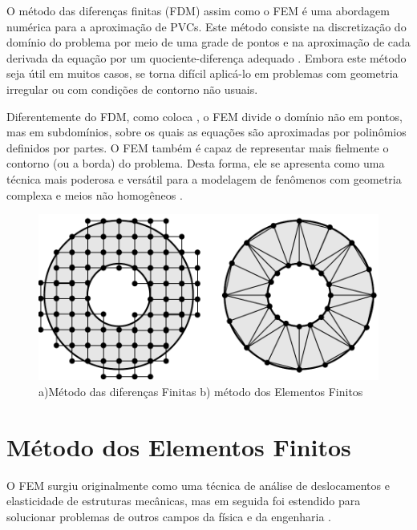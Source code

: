 \documentclass[
    12pt,               %
    openright,          %
    oneside,
    a4paper,            %
    english,            %
    french,             %
    spanish,            %
    brazil              %
    ]{abntex2}
\begin{document}
O método das diferenças finitas (FDM) assim como o FEM é uma abordagem numérica para a aproximação de PVCs. Este método consiste na discretização do domínio do problema por meio de uma grade de pontos e na aproximação de cada derivada da equação por um quociente-diferença adequado
\cite{burdenFaires}. Embora este método seja útil em muitos casos, se torna difícil aplicá-lo em problemas com geometria irregular ou com condições de contorno não usuais.

Diferentemente do FDM, como coloca , o FEM divide o domínio não em pontos, mas em subdomínios, sobre os quais as equações são aproximadas por polinômios definidos por partes. O FEM também é capaz de representar mais fielmente o contorno (ou a borda) do problema. Desta forma, ele se apresenta como uma técnica mais poderosa e versátil para a modelagem de fenômenos com geometria complexa e meios não homogêneos \cite{sadiku}. 

\begin{figure}[!htb]
	\centering
	\includegraphics[scale=0.5]{figuras/fdm_fem.pdf}
	\caption{a)Método das diferenças Finitas b) método dos Elementos Finitos}
	\label{fig:mdfFem}
\end{figure}

\section{Método dos Elementos Finitos}

O FEM surgiu originalmente como uma técnica de análise de deslocamentos e elasticidade de estruturas mecânicas, mas em seguida foi estendido para solucionar problemas de outros campos da física e da engenharia \cite{jin, desai, zien}.
\end{document}
